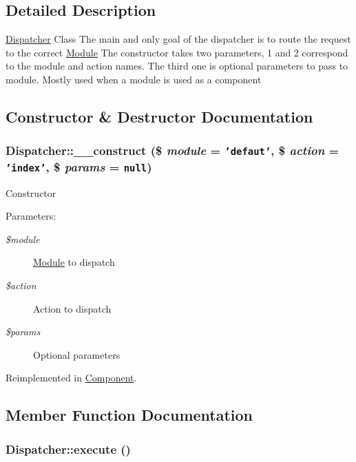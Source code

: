 \subsection{Detailed Description}
\hyperlink{classDispatcher}{Dispatcher} Class The main and only goal of the dispatcher is to route the request to the correct \hyperlink{classModule}{Module} The constructor takes two parameters, 1 and 2 correspond to the module and action names. The third one is optional parameters to pass to module. Mostly used when a module is used as a component 

\subsection{Constructor \& Destructor Documentation}
\hypertarget{classDispatcher_d9596c149149dc310c56d6b8dea95474}{
\subsubsection[\_\-\_\-construct]{\setlength{\rightskip}{0pt plus 5cm}Dispatcher::\_\-\_\-construct (\$ {\em module} = {\tt 'defaut'}, \/  \$ {\em action} = {\tt 'index'}, \/  \$ {\em params} = {\tt null})}}
\label{classDispatcher_d9596c149149dc310c56d6b8dea95474}


Constructor

\begin{Desc}
\item[Parameters:]
\begin{description}
\item[{\em \$module}]\hyperlink{classModule}{Module} to dispatch \item[{\em \$action}]Action to dispatch \item[{\em \$params}]Optional parameters \end{description}
\end{Desc}


Reimplemented in \hyperlink{classComponent_941aa95779d197b421b80d79a689da80}{Component}.

\subsection{Member Function Documentation}
\hypertarget{classDispatcher_197c4fd2505bb88796f0dd9a2240c787}{
\subsubsection[execute]{\setlength{\rightskip}{0pt plus 5cm}Dispatcher::execute ()}}
\label{classDispatcher_197c4fd2505bb88796f0dd9a2240c787}


